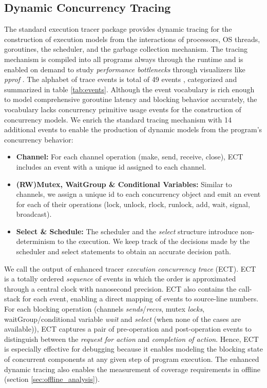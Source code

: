 \subsection{Dynamic Concurrency Tracing}
\label{sec:dynamic_tracing}
The standard execution tracer package \cite{go-package-trace,go-cmd-trace} provides dynamic tracing for the construction of execution models from the interactions of processors, OS threads, goroutines, the scheduler, and the garbage collection mechanism.
%
The tracing mechanism is compiled into all programs always through the runtime and is enabled on demand to study \textit{performance bottlenecks} through visualizers like \textit{pprof} \cite{go-profile-blog}.
%
The alphabet of trace events is total of 49 events \cite{goParserSource}, categorized and summarized in table \ref{tab:events}.
%
Although the event vocabulary is rich enough to model comprehensive goroutine latency and blocking behavior accurately,
the vocabulary lacks concurrency primitive usage events for the construction of concurrency models.
%
We enrich the standard tracing mechanism with 14 additional events to enable the production of dynamic models from the program's concurrency behavior:
\begin{itemize}
    \item \textbf{Channel:} For each channel operation (make, send, receive, close), ECT includes an event with a unique id assigned to each channel.
    \item \textbf{(RW)Mutex, WaitGroup \& Conditional Variables:} Similar to channels, we assign a unique id to each concurrency object and emit an event for each of their operations (lock, unlock, rlock, runlock, add, wait, signal, broadcast).
    \item \textbf{Select \& Schedule:} The scheduler and the \textit{select} structure introduce non-determinism to the execution. We keep track of the decisions made by the scheduler and select statements to obtain an accurate decision path.
\end{itemize}

We call the output of enhanced tracer \textit{execution concurrency trace} (ECT).
%
ECT is a totally ordered \textit{sequence} of events in which the order is approximated through a central clock with nanosecond precision.
%
ECT also contains the call-stack for each event, enabling a direct mapping of events to source-line numbers.
%
For each blocking operation (channels \textit{sends}/\textit{recvs}, mutex \textit{locks}, waitGroup/conditional variable \textit{wait} and \textit{select} (when none of the cases are available)), ECT captures a pair of pre-operation and post-operation events to distinguish between the \textit{request for action} and \textit{completion of action}.
%
Hence, ECT is especially effective for debugging because it enables modeling the blocking state of concurrent components at any given step of program execution.
%
The enhanced dynamic tracing also enables the measurement of coverage requirements in offline (section \ref{sec:offline_analysis}).

